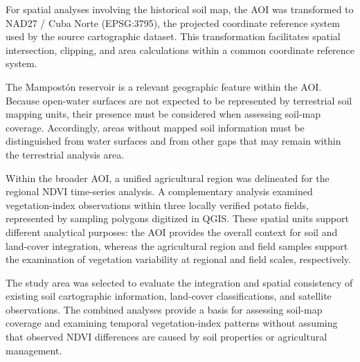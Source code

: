 For spatial analyses involving the historical soil
map, the AOI was transformed to NAD27 / Cuba Norte
(EPSG:3795), the projected coordinate reference
system used by the source cartographic dataset.
This transformation facilitates spatial
intersection, clipping, and area calculations
within a common coordinate reference system.

The Mampostón reservoir is a relevant geographic
feature within the AOI. Because open-water surfaces
are not expected to be represented by terrestrial
soil mapping units, their presence must be
considered when assessing soil-map coverage.
Accordingly, areas without mapped soil information
must be distinguished from water surfaces and
from other gaps that may remain within the
terrestrial analysis area.

Within the broader AOI, a unified agricultural
region was delineated for the regional NDVI
time-series analysis. A complementary analysis
examined vegetation-index observations within
three locally verified potato fields, represented
by sampling polygons digitized in QGIS. These
spatial units support different analytical
purposes: the AOI provides the overall context
for soil and land-cover integration, whereas the
agricultural region and field samples support
the examination of vegetation variability at
regional and field scales, respectively.

The study area was selected to evaluate the
integration and spatial consistency of existing
soil cartographic information, land-cover
classifications, and satellite observations.
The combined analyses provide a basis for
assessing soil-map coverage and examining
temporal vegetation-index patterns without
assuming that observed NDVI differences are
caused by soil properties or agricultural
management.

